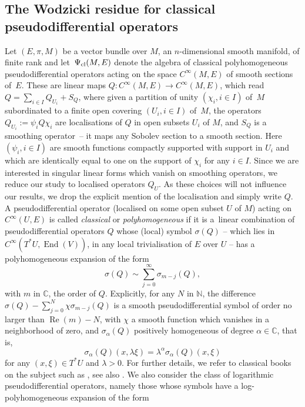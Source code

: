 \documentclass[10pt,a4paper]{amsart}
\numberwithin{equation}{section}
\theoremstyle{definition}
\newcommand{\C}{\mathbb C}
\newcommand{\N}{\mathbb N}
\begin{document}
\subsection{The Wodzicki residue for classical pseudodifferential operators}
Let $(E,\pi,M)$ be a vector bundle over $M$, an $n$-dimensional smooth manifold, of finite rank and let~$\Psi_{\rm cl}(M, E)$ denote the algebra of classical polyhomogeneous pseudodifferential operators acting on the space $C^\infty(M, E)$ of smooth sections of~$E$. These are linear maps $Q\colon C^\infty(M, E)\to C^\infty(M, E)$, which read $Q=\sum_{i\in I} Q_{U_i} +S_Q$, where given a partition of unity $(\chi_i, i\in I)$ of~$M$ subordinated to a finite open covering $(U_i, i\in I)$ of~$M$, the operators $Q_{U_i}:= \psi_i Q \chi_i $ are localisations of $Q$ in open subsets $U_i$ of $M$, and $S_Q$ is a smoothing operator~-- it maps any Sobolev section to a smooth section. Here $(\psi_i, i\in I)$ are smooth functions compactly supported with support in $U_i$ and which are identically equal to one on the support of $\chi_i$ for any $i\in I$. Since we are interested in singular linear forms which vanish on smoothing operators, we reduce our study to localised operators $Q_U$. As these choices will not influence our results, we drop the explicit mention of the localisation and simply write $Q$. A pseudodifferential operator (localised on some open subset $U$ of $M$) acting on $C^\infty(U, E)$ is called {\it classical} or {\it polyhomogeneous} if it is a~linear combination of pseudodifferential operators $Q$ whose (local) symbol $\sigma(Q)$ -- which lies in {$C^\infty(T^*U ,\operatorname{End}(V))$},
in any local trivialisation of $E$ over $U$ -- has a polyhomogeneous expansion of the form
\[\sigma(Q)\sim\sum_{j=0}^\infty \sigma_{m-j}(Q), \]
 with
$m$ in $ \C$, the order of $Q$. Explicitly, for any $N$ in $\N$, the difference
$\sigma(Q)-\sum_{j=0}^N\chi \sigma_{m-j}(Q)$ is a smooth pseudodifferential symbol of order no larger than $\operatorname{Re}(m)-N$, with $\chi$ a smooth function which vanishes in a neighborhood of zero, and $ \sigma_{\alpha}(Q)$ positively homogeneous of degree $\alpha\in \C$, that is,
\begin{equation*}
\sigma_{\alpha}(Q) (x,\lambda \xi)=\lambda^{\alpha} \sigma_{\alpha}(Q)(x, \xi)\end{equation*}
for any { $(x,\xi)\in T^*U $} and $\lambda>0$. For further details, we refer to classical books on the subject such as \cite{Sh}, see also \cite[Example~1.1.8]{Sc}.
We also consider the class of logarithmic pseudodifferential operators, namely those whose symbols have a log-polyhomogeneous expansion of the form
\end{document}
